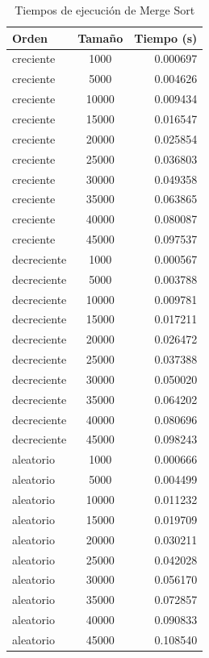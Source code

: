 \documentclass[a4paper, 11pt]{article}
\begin{document}
\begin{table}[H]
\centering
\begin{tabular}{|l|c|r|}
\hline
Orden & Tamaño & Tiempo (s) \\
\hline
creciente & 1000 & 0.000697 \\
creciente & 5000 & 0.004626 \\
creciente & 10000 & 0.009434 \\
creciente & 15000 & 0.016547 \\
creciente & 20000 & 0.025854 \\
creciente & 25000 & 0.036803 \\
creciente & 30000 & 0.049358 \\
creciente & 35000 & 0.063865 \\
creciente & 40000 & 0.080087 \\
creciente & 45000 & 0.097537 \\
\hline
decreciente & 1000 & 0.000567 \\
decreciente & 5000 & 0.003788 \\
decreciente & 10000 & 0.009781 \\
decreciente & 15000 & 0.017211 \\
decreciente & 20000 & 0.026472 \\
decreciente & 25000 & 0.037388 \\
decreciente & 30000 & 0.050020 \\
decreciente & 35000 & 0.064202 \\
decreciente & 40000 & 0.080696 \\
decreciente & 45000 & 0.098243 \\
\hline
aleatorio & 1000 & 0.000666 \\
aleatorio & 5000 & 0.004499 \\
aleatorio & 10000 & 0.011232 \\
aleatorio & 15000 & 0.019709 \\
aleatorio & 20000 & 0.030211 \\
aleatorio & 25000 & 0.042028 \\
aleatorio & 30000 & 0.056170 \\
aleatorio & 35000 & 0.072857 \\
aleatorio & 40000 & 0.090833 \\
aleatorio & 45000 & 0.108540 \\
\hline
\end{tabular}
\caption{Tiempos de ejecución de Merge Sort}
\label{tab:merge_results}
\end{table}
\end{document}
